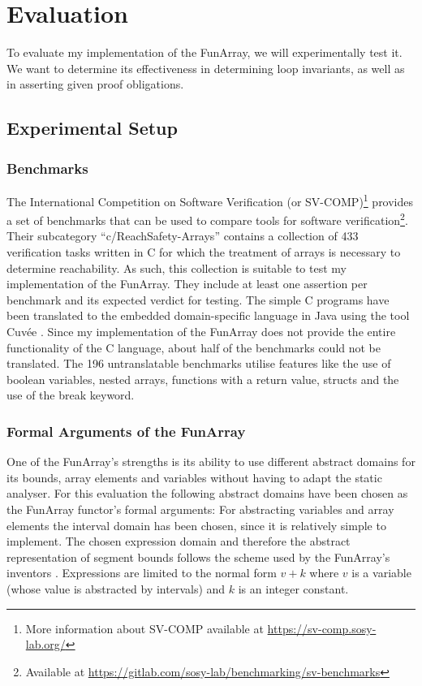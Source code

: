 \chapter{Evaluation}\label{chap:evaluation}

To evaluate my implementation of the FunArray, we will experimentally test it. We want to determine its effectiveness in determining loop invariants, as well as in asserting given proof obligations.

\section{Experimental Setup}
\subsection{Benchmarks}

The International Competition on Software Verification (or SV-COMP)\footnote{More information about SV-COMP available at \url{https://sv-comp.sosy-lab.org/}} provides a set of benchmarks that can be used to compare tools for software verification\footnote{Available at \url{https://gitlab.com/sosy-lab/benchmarking/sv-benchmarks}}. Their subcategory ``c/ReachSafety-Arrays'' contains a collection of 433 verification tasks written in C for which the treatment of arrays is necessary to determine reachability. As such, this collection is suitable to test my implementation of the FunArray. They include at least one assertion per benchmark and its expected verdict for testing.
The simple C programs have been translated to the embedded domain-specific language in Java using the tool Cuv\'ee \cite{ernst2020}. Since my implementation of the FunArray does not provide the entire functionality of the C language, about half of the benchmarks could not be translated. The 196 untranslatable benchmarks utilise features like the use of boolean variables, nested arrays, functions with a return value, structs and the use of the break keyword.

\subsection{Formal Arguments of the FunArray}

One of the FunArray's strengths is its ability to use different abstract domains for its bounds, array elements and variables without having to adapt the static analyser. For this evaluation the following abstract domains have been chosen as the FunArray functor's formal arguments: For abstracting variables and array elements the interval domain has been chosen, since it is relatively simple to implement. The chosen expression domain and therefore the abstract representation of segment bounds follows the scheme used by the FunArray's inventors \cite[section 7.2]{cousot2011}. Expressions are limited to the normal form $v+k$ where $v$ is a variable (whose value is abstracted by intervals) and $k$ is an integer constant.

